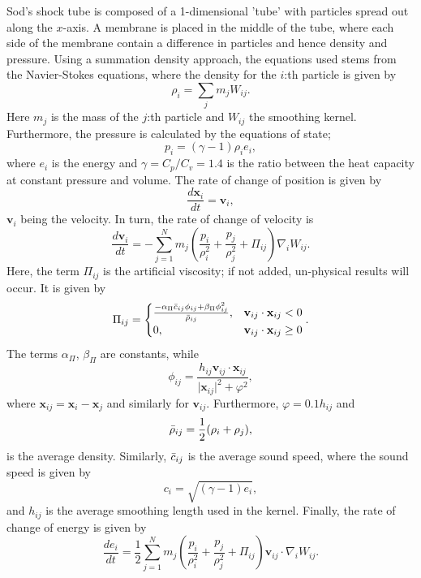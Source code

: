 \documentclass[12pt]{article}
\begin{document}
Sod's shock tube is composed of a 1-dimensional 'tube' with particles spread out along the $x$-axis. A membrane is placed in the middle of the tube, where each side of the membrane contain a difference in particles and hence density and pressure. Using a summation density approach, the equations used stems from the Navier-Stokes equations, where the density for the $i$:th particle is given by 
\begin{equation}
	\rho_i = \sum_j m_jW_{ij}.
\end{equation}
Here $m_j$ is the mass of the $j$:th particle and $W_{ij}$ the smoothing kernel. Furthermore, the pressure is calculated by the equations of state;
\begin{equation}
	p_i = (\gamma - 1)\rho_ie_i,
\end{equation}
where $e_i$ is the energy and $\gamma = C_p/C_v = 1.4$ is the ratio between the heat capacity at constant pressure and volume. The rate of change of position is given by 
\begin{equation}
	\frac{d\mathbf{x}_i}{dt} = \mathbf{v}_i,
\end{equation}
$\mathbf{v}_i$ being the velocity. In turn, the rate of change of velocity is
\begin{equation}
	\frac{d\mathbf{v}_i}{dt} = -\sum_{j=1}^N m_j\left(\frac{p_i}{\rho_i^2} + \frac{p_j}{\rho_j^2} + \Pi_{ij}\right)\nabla_iW_{ij}.
\end{equation}
Here, the term $\Pi_{ij}$ is the artificial viscosity; if not added, un-physical results will occur. It is given by 
\begin{equation}
	\Pi_{ij} = 
	\begin{cases}
		\frac{-\alpha_\Pi\Bar{c}_{ij}\phi_{ij} + \beta_\Pi\phi_{ij}^2}{\Bar{\rho}_{ij}}, &\mathbf{v}_{ij}\cdot\mathbf{x}_{ij} < 0\\
		0 ,&\mathbf{v}_{ij}\cdot\mathbf{x}_{ij} \geq 0
	\end{cases}.
\end{equation}
The terms $\alpha_\Pi$, $\beta_\Pi$ are constants, while
\begin{equation}
	\phi_{ij} = \frac{h_{ij}\mathbf{v}_{ij}\cdot\mathbf{x}_{ij}}{\vert\mathbf{x}_{ij}\vert^2 + \varphi^2},
\end{equation}
where $\mathbf{x}_{ij} = \mathbf{x}_i - \mathbf{x}_j$ and similarly for $\mathbf{v}_{ij}$. Furthermore, $\varphi = 0.1h_{ij}$ and 
\begin{equation}
	\Bar{\rho}_{ij} = \frac{1}{2}(\rho_i + \rho_j),
\end{equation}
is the average density. Similarly, $\Bar{c}_{ij}$ is the average sound speed, where the sound speed is given by 
\begin{equation}
	c_i = \sqrt{(\gamma - 1)e_i},
\end{equation}
and $h_{ij}$ is the average smoothing length used in the kernel. Finally, the rate of change of energy is given by 
\begin{equation}
	\frac{de_i}{dt} = \frac{1}{2}\sum_{j=1}^N m_j\left(\frac{p_i}{\rho_i^2} + \frac{p_j}{\rho_j^2} + \Pi_{ij}\right)\mathbf{v}_{ij}\cdot\nabla_iW_{ij}.
\end{equation}
\end{document}
